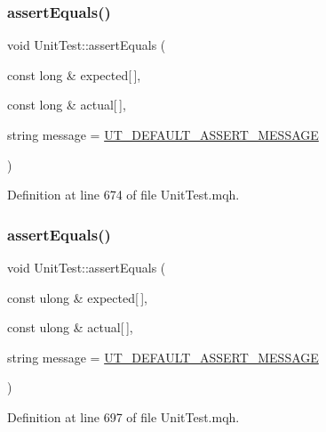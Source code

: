 \subsubsection{\texorpdfstring{assert\+Equals()}{assertEquals()}\hspace{0.1cm}{\footnotesize\ttfamily [22/28]}}
{\footnotesize\ttfamily void Unit\+Test\+::assert\+Equals (\begin{DoxyParamCaption}\item[{const long \&}]{expected\mbox{[}$\,$\mbox{]},  }\item[{const long \&}]{actual\mbox{[}$\,$\mbox{]},  }\item[{string}]{message = {\ttfamily \mbox{\hyperlink{_unit_test_8mqh_a96f5d62188d09039ebc3f443c9120e39}{U\+T\+\_\+\+D\+E\+F\+A\+U\+L\+T\+\_\+\+A\+S\+S\+E\+R\+T\+\_\+\+M\+E\+S\+S\+A\+GE}}} }\end{DoxyParamCaption})}



Definition at line 674 of file Unit\+Test.\+mqh.

\mbox{\label{class_unit_test_ad87b2bc55a39171b20726481f273a618}} 
\subsubsection{\texorpdfstring{assert\+Equals()}{assertEquals()}\hspace{0.1cm}{\footnotesize\ttfamily [23/28]}}
{\footnotesize\ttfamily void Unit\+Test\+::assert\+Equals (\begin{DoxyParamCaption}\item[{const ulong \&}]{expected\mbox{[}$\,$\mbox{]},  }\item[{const ulong \&}]{actual\mbox{[}$\,$\mbox{]},  }\item[{string}]{message = {\ttfamily \mbox{\hyperlink{_unit_test_8mqh_a96f5d62188d09039ebc3f443c9120e39}{U\+T\+\_\+\+D\+E\+F\+A\+U\+L\+T\+\_\+\+A\+S\+S\+E\+R\+T\+\_\+\+M\+E\+S\+S\+A\+GE}}} }\end{DoxyParamCaption})}



Definition at line 697 of file Unit\+Test.\+mqh.

\mbox{\label{class_unit_test_a602ed90782429bbec283f40c90386a1d}} 
